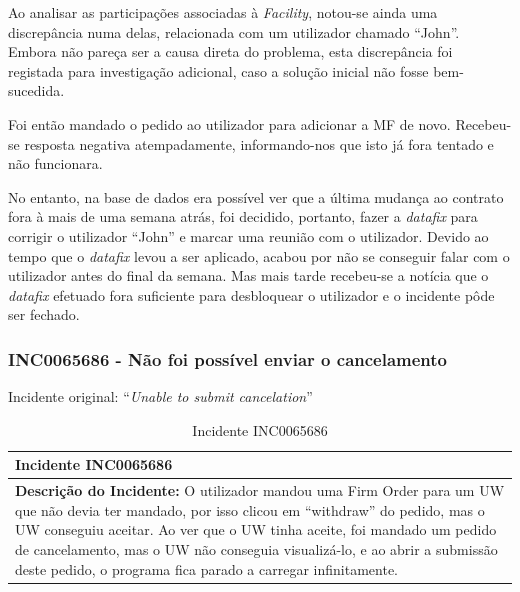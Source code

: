             Ao analisar as participações associadas à \textit{Facility}, notou-se ainda uma discrepância numa delas, relacionada com um utilizador chamado ``John''. Embora não pareça ser a causa direta do problema, esta discrepância foi registada para investigação adicional, caso a solução inicial não fosse bem-sucedida.

            Foi então mandado o pedido ao utilizador para adicionar a MF de novo. Recebeu-se resposta negativa atempadamente, informando-nos que isto já fora tentado e não funcionara.
            
            No entanto, na base de dados era possível ver que a última mudança ao contrato fora à mais de uma semana atrás, foi decidido, portanto, fazer a \textit{datafix} para corrigir o utilizador ``John'' e marcar uma reunião com o utilizador. Devido ao tempo que o \textit{datafix} levou a ser aplicado, acabou por não se conseguir falar com o utilizador antes do final da semana. Mas mais tarde recebeu-se a notícia que o \textit{datafix} efetuado fora suficiente para desbloquear o utilizador e o incidente pôde ser fechado.
            
        \subsubsection{INC0065686 - Não foi possível enviar o cancelamento}\label{secsec:inc0065686} %
                
            Incidente original: ``\textit{Unable to submit cancelation}''

            \begin{table}[H] %
                \centering
                \begin{tabularx}{1\textwidth}{|>{\raggedright\arraybackslash}X|}
                    \hline
                    \rowcolor{lightgray}
                    \textbf{Incidente INC0065686} \\
                    \hline
                    \rowcolor{lightgray!20}
                
                    \textbf{Descrição do Incidente:} O utilizador mandou uma Firm Order para um UW que não devia ter mandado, por isso clicou em ``withdraw'' do pedido, mas o UW conseguiu aceitar. Ao ver que o UW tinha aceite, foi mandado um pedido de cancelamento, mas o UW não conseguia visualizá-lo, e ao abrir a submissão deste pedido, o programa fica parado a carregar infinitamente.

                    \\
                    \hline
                \end{tabularx}
                \caption{Incidente INC0065686}\label{table:incINC0065686}
            \end{table}

